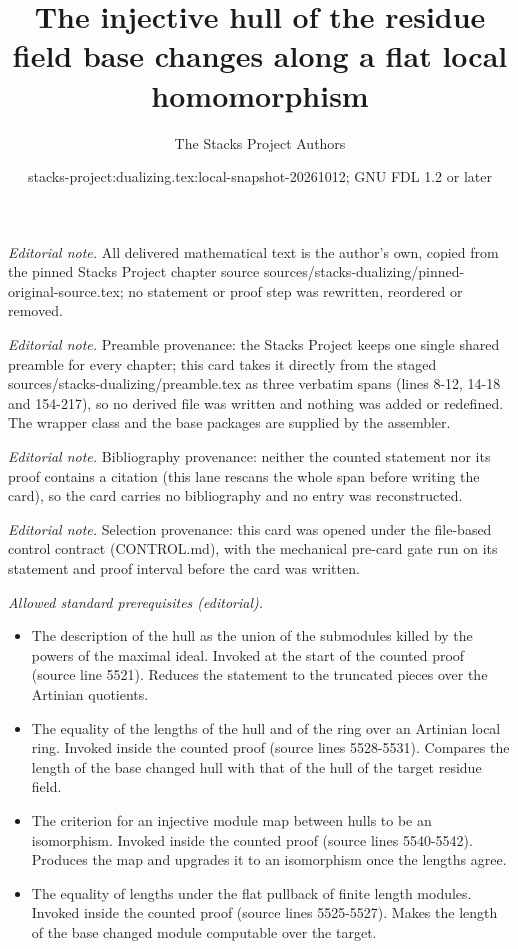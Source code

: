 \documentclass[10pt,a4paper]{amsart}
\title{The injective hull of the residue field base changes along a flat local homomorphism}
\author{The Stacks Project Authors}
\date{stacks-project:dualizing.tex:local-snapshot-20261012; GNU FDL 1.2 or later}
\theoremstyle{plain}
\theoremstyle{definition}
\theoremstyle{remark}
\numberwithin{equation}{subsection}
\begin{document}
\maketitle
\noindent\textit{Editorial note.} All delivered mathematical text is the author's own, copied from the pinned Stacks Project chapter source sources/stacks-dualizing/pinned-original-source.tex; no statement or proof step was rewritten, reordered or removed.\par\medskip
\noindent\textit{Editorial note.} Preamble provenance: the Stacks Project keeps one single shared preamble for every chapter; this card takes it directly from the staged sources/stacks-dualizing/preamble.tex as three verbatim spans (lines 8-12, 14-18 and 154-217), so no derived file was written and nothing was added or redefined. The wrapper class and the base packages are supplied by the assembler.\par\medskip
\noindent\textit{Editorial note.} Bibliography provenance: neither the counted statement nor its proof contains a citation (this lane rescans the whole span before writing the card), so the card carries no bibliography and no entry was reconstructed.\par\medskip
\noindent\textit{Editorial note.} Selection provenance: this card was opened under the file-based control contract (CONTROL.md), with the mechanical pre-card gate run on its statement and proof interval before the card was written.\par\medskip
\noindent\textit{Allowed standard prerequisites (editorial).}\begin{itemize}
\item The description of the hull as the union of the submodules killed by the powers of the maximal ideal. Invoked at the start of the counted proof (source line 5521). Reduces the statement to the truncated pieces over the Artinian quotients.
\item The equality of the lengths of the hull and of the ring over an Artinian local ring. Invoked inside the counted proof (source lines 5528-5531). Compares the length of the base changed hull with that of the hull of the target residue field.
\item The criterion for an injective module map between hulls to be an isomorphism. Invoked inside the counted proof (source lines 5540-5542). Produces the map and upgrades it to an isomorphism once the lengths agree.
\item The equality of lengths under the flat pullback of finite length modules. Invoked inside the counted proof (source lines 5525-5527). Makes the length of the base changed module computable over the target.
\end{itemize}\medskip
\end{document}
